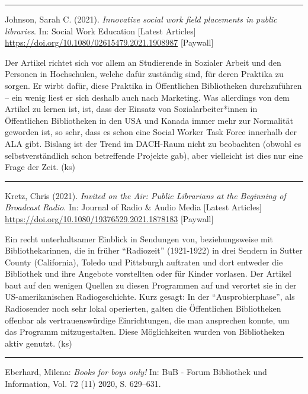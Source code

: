 \documentclass[a4paper,
fontsize=11pt,
oneside,
numbers=noperiodatend,
parskip=half-,
bibliography=totoc,
final
]{scrartcl}
\begin{document}
\begin{center}\rule{0.5\linewidth}{0.5pt}\end{center}

Johnson, Sarah C. (2021). \emph{Innovative social work field placements
in public libraries}. In: Social Work Education {[}Latest Articles{]}
\url{https://doi.org/10.1080/02615479.2021.1908987} {[}Paywall{]}

Der Artikel richtet sich vor allem an Studierende in Sozialer Arbeit und
den Personen in Hochschulen, welche dafür zuständig sind, für deren
Praktika zu sorgen. Er wirbt dafür, diese Praktika in Öffentlichen
Bibliotheken durchzuführen -- ein wenig liest er sich deshalb auch nach
Marketing. Was allerdings von dem Artikel zu lernen ist, ist, dass der
Einsatz von Sozialarbeiter*innen in Öffentlichen Bibliotheken in den USA
und Kanada immer mehr zur Normalität geworden ist, so sehr, dass es
schon eine Social Worker Task Force innerhalb der ALA gibt. Bislang ist
der Trend im DACH-Raum nicht zu beobachten (obwohl es selbstverständlich
schon betreffende Projekte gab), aber vielleicht ist dies nur eine Frage
der Zeit. (ks)

\begin{center}\rule{0.5\linewidth}{0.5pt}\end{center}

Kretz, Chris (2021). \emph{Invited on the Air: Public Librarians at the
Beginning of Broadcast Radio}. In: Journal of Radio \& Audio Media
{[}Latest Articles{]}
\url{https://doi.org/10.1080/19376529.2021.1878183} {[}Paywall{]}

Ein recht unterhaltsamer Einblick in Sendungen von, beziehungsweise mit
Bibliothekarinnen, die in früher \enquote{Radiozeit} (1921-1922) in drei
Sendern in Sutter County (California), Toledo und Pittsburgh auftraten
und dort entweder die Bibliothek und ihre Angebote vorstellten oder für
Kinder vorlasen. Der Artikel baut auf den wenigen Quellen zu diesen
Programmen auf und verortet sie in der US-amerikanischen
Radiogeschichte. Kurz gesagt: In der \enquote{Ausprobierphase}, als
Radiosender noch sehr lokal operierten, galten die Öffentlichen
Bibliotheken offenbar als vertrauenswürdige Einrichtungen, die man
ansprechen konnte, um das Programm mitzugestalten. Diese Möglichkeiten
wurden von Bibliotheken aktiv genutzt. (ks)

\begin{center}\rule{0.5\linewidth}{0.5pt}\end{center}

Eberhard, Milena: \emph{Books for boys only!} In: BuB - Forum Bibliothek
und Information, Vol. 72 (11) 2020, S. 629--631.
\end{document}
